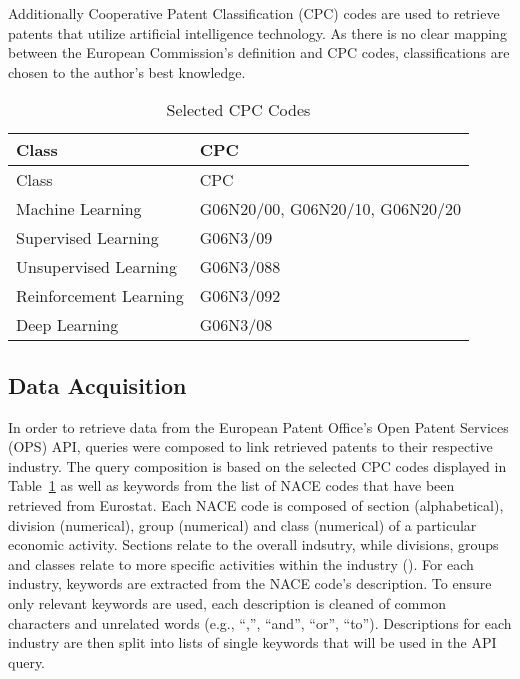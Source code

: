 \documentclass[
  11,
  a4paperpaper,
]{article}
\begin{document}
Additionally Cooperative Patent Classification (CPC) codes are used to
retrieve patents that utilize artificial intelligence technology. As
there is no clear mapping between the European Commission's definition
and CPC codes, classifications are chosen to the author's best
knowledge.

\label{tbl-cpc-codes}
\begin{longtable}[]{@{}ll@{}}
\caption{\label{tbl-cpc-codes}Selected CPC Codes}\tabularnewline
\toprule\noalign{}
Class & CPC \\
\midrule\noalign{}
\endfirsthead
\toprule\noalign{}
Class & CPC \\
\midrule\noalign{}
\endhead
\bottomrule\noalign{}
\endlastfoot
Machine Learning & G06N20/00, G06N20/10, G06N20/20 \\
Supervised Learning & G06N3/09 \\
Unsupervised Learning & G06N3/088 \\
Reinforcement Learning & G06N3/092 \\
Deep Learning & G06N3/08 \\
\end{longtable}

\subsection{Data Acquisition}\label{data-acquisition}

In order to retrieve data from the European Patent Office's Open Patent
Services (OPS) API, queries were composed to link retrieved patents to
their respective industry. The query composition is based on the
selected CPC codes displayed in Table~\ref{tbl-cpc-codes} as well as
keywords from the list of NACE codes that have been retrieved from
Eurostat. Each NACE code is composed of section (alphabetical), division
(numerical), group (numerical) and class (numerical) of a particular
economic activity. Sections relate to the overall indsutry, while
divisions, groups and classes relate to more specific activities within
the industry (). For each
industry, keywords are extracted from the NACE code's description. To
ensure only relevant keywords are used, each description is cleaned of
common characters and unrelated words (e.g., ``,'', ``and'', ``or'',
``to''). Descriptions for each industry are then split into lists of
single keywords that will be used in the API query.
\end{document}
